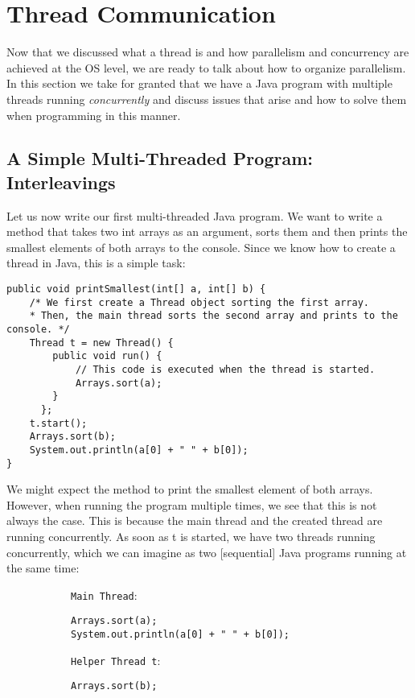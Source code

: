 \documentclass[main.tex]{subfiles}
\begin{document}
\addtolength{\tabcolsep}{-2pt}

\section{Thread Communication}
Now that we discussed what a thread is and how parallelism and concurrency are achieved at the OS level, we are ready to talk about how to organize parallelism.\\
In this section we take for granted that we have a Java program with multiple threads running \textit{concurrently} and discuss issues that arise and how to solve them when programming in this manner.

\subsection{A Simple Multi-Threaded Program: Interleavings}
Let us now write our first multi-threaded Java program. We want to write a method that takes two int arrays as an argument, sorts them and then prints the smallest elements of both arrays to the console. Since we know how to create a thread in Java, this is a simple task:
\begin{verbatim}
public void printSmallest(int[] a, int[] b) {
    /* We first create a Thread object sorting the first array.
    * Then, the main thread sorts the second array and prints to the console. */
    Thread t = new Thread() {
        public void run() {
            // This code is executed when the thread is started.
            Arrays.sort(a);
        }
      };
    t.start();
    Arrays.sort(b);
    System.out.println(a[0] + " " + b[0]);
}
\end{verbatim}
We might expect the method to print the smallest element of both arrays. However, when running the program multiple times, we see that this is not always the case. This is because the main thread and the created thread are running concurrently. As soon as t is started, we have two threads running concurrently, which we can imagine as two [sequential] Java programs running at the same time:
\begin{figure}[H]
    \begin{subfigure}[t]{.6\textwidth}
        \texttt{Main Thread}:
        \begin{verbatim}
Arrays.sort(a);
System.out.println(a[0] + " " + b[0]);
        \end{verbatim}
    \end{subfigure}%
    \begin{subfigure}[t]{.6\textwidth}
        \texttt{Helper Thread t}:
        \begin{verbatim}
Arrays.sort(b);
        \end{verbatim}
    \end{subfigure}
\end{figure}
\end{document}
